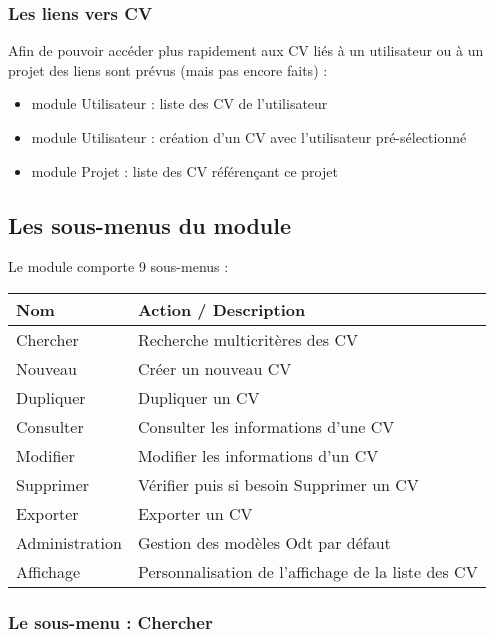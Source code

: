 \subsubsection{Les liens vers CV}

Afin de pouvoir accéder plus rapidement aux CV liés à un utilisateur ou à un projet des liens sont prévus (mais pas encore faits) :\\

\begin{itemize}
\item module Utilisateur : liste des CV de l'utilisateur
\item module Utilisateur : création d'un CV avec l'utilisateur pré-sélectionné
\item module Projet : liste des CV référençant ce projet
\end{itemize}




\subsection{Les sous-menus du module \cv}

Le module \cv comporte 9 sous-menus :\\

\begin{tabular}{|p{2.5cm}|p{9.5cm}|}
\hline
\textbf{Nom} & \textbf{Action / Description} \\
\hline
Chercher & Recherche multicritères des CV\\
\hline
Nouveau & Créer un nouveau CV\\
\hline
Dupliquer & Dupliquer un CV\\
\hline
Consulter & Consulter les informations d'une CV\\
\hline
Modifier & Modifier les informations d'un CV\\
\hline
Supprimer & Vérifier puis si besoin Supprimer un CV\\
\hline
Exporter & Exporter un CV\\
\hline
Administration & Gestion des modèles Odt par défaut\\
\hline
Affichage & Personnalisation de l'affichage de la liste des CV\\
\hline
\end{tabular}


\subsubsection{Le sous-menu : Chercher}

